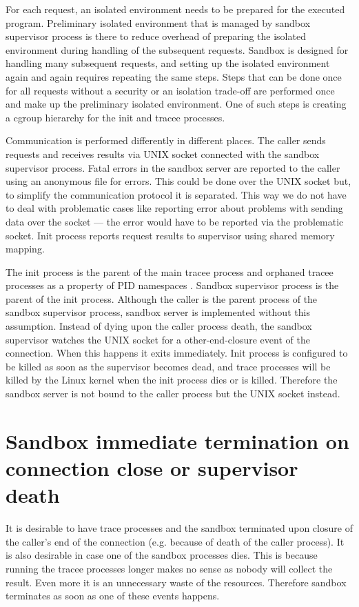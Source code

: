 \documentclass[en]{pracamgr}
\begin{document}
For each request, an isolated environment needs to be prepared for the executed program. Preliminary isolated environment that is managed by sandbox supervisor process is there to reduce overhead of preparing the isolated environment during handling of the subsequent requests. Sandbox is designed for handling many subsequent requests, and setting up the isolated environment again and again requires repeating the same steps. Steps that can be done once for all requests without a security or an isolation trade-off are performed once and make up the preliminary isolated environment. One of such steps is creating a cgroup hierarchy for the init and tracee processes.

Communication is performed differently in different places. The caller sends requests and receives results via UNIX socket connected with the sandbox supervisor process. Fatal errors in the sandbox server are reported to the caller using an anonymous file for errors. This could be done over the UNIX socket but, to simplify the communication protocol it is separated. This way we do not have to deal with problematic cases like reporting error about problems with sending data over the socket --- the error would have to be reported via the problematic socket. Init process reports request results to supervisor using shared memory mapping.

The init process is the parent of the main tracee process and orphaned tracee processes as a property of PID namespaces \cite{man_pid_namespaces}. Sandbox supervisor process is the parent of the init process. Although the caller is the parent process of the sandbox supervisor process, sandbox server is implemented without this assumption. Instead of dying upon the caller process death, the sandbox supervisor watches the UNIX socket for a other-end-closure event of the connection. When this happens it exits immediately. Init process is configured to be killed as soon as the supervisor becomes dead, and trace processes will be killed by the Linux kernel when the init process dies or is killed. Therefore the sandbox server is not bound to the caller process but the UNIX socket instead.

\section{Sandbox immediate termination on connection close or supervisor death}

It is desirable to have trace processes and the sandbox terminated upon closure of the caller's end of the connection (e.g. because of death of the caller process). It is also desirable in case one of the sandbox processes dies. This is because running the tracee processes longer makes no sense as nobody will collect the result. Even more it is an unnecessary waste of the resources. Therefore sandbox terminates as soon as one of these events happens.
\end{document}
